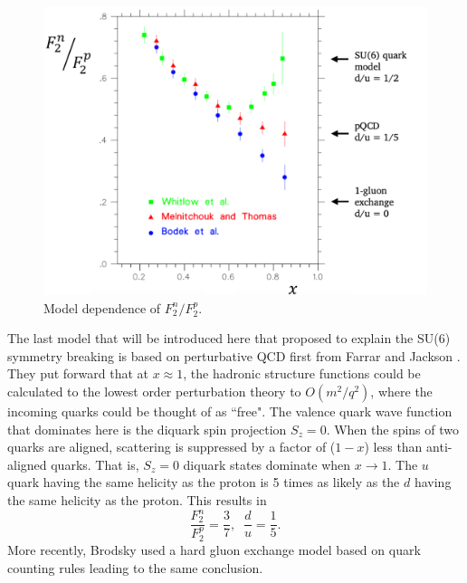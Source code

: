 \begin{figure}[h!]
	\centering
	\includegraphics[width=0.9\linewidth]{figures/f2n_f2p_models.png}
	\caption{Model dependence of $F_2^n/F_2^p$. \cite{marathon}}
	\label{fig:f2n_f2p_models}
\end{figure}

The last model that will be introduced here that proposed to explain the SU(6) symmetry breaking is based on perturbative QCD first from Farrar and Jackson \cite{physlett:farrar}. They put forward that at $x \approx 1$, the hadronic structure functions could be calculated to the lowest order perturbation theory to $O(m^2/q^2)$, where the incoming quarks could be thought of as ``free". The valence quark wave function that dominates here is the diquark spin projection $S_z = 0$. When the spins of two quarks are aligned, scattering is suppressed by a factor of ($1-x$) less than anti-aligned quarks. That is, $S_z = 0$ diquark states dominate when $x \rightarrow 1$. The $u$ quark having the same helicity as the proton is 5 times as likely as the $d$ having the same helicity as the proton. This results in
\begin{equation}
\frac{F_2^n}{F_2^p}  = \frac{3}{7}, \; \; \frac{d}{u} =\frac{1}{5}.
\end{equation}
More recently, Brodsky \cite{brodsky} used a hard gluon exchange model based on quark counting rules leading to the same conclusion.
 
